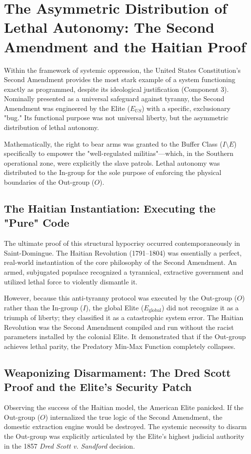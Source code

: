 \documentclass[12pt,openany]{book}
\begin{document}
\section{The Asymmetric Distribution of Lethal Autonomy: The Second Amendment and the Haitian Proof}

Within the framework of systemic oppression, the United States Constitution’s Second Amendment provides the most stark example of a system functioning exactly as programmed, despite its ideological justification (Component 3). Nominally presented as a universal safeguard against tyranny, the Second Amendment was engineered by the Elite ($E_{US}$) with a specific, exclusionary "bug." Its functional purpose was not universal liberty, but the asymmetric distribution of lethal autonomy.

Mathematically, the right to bear arms was granted to the Buffer Class ($I \setminus E$) specifically to empower the "well-regulated militias"—which, in the Southern operational zone, were explicitly the slave patrols. Lethal autonomy was distributed to the In-group for the sole purpose of enforcing the physical boundaries of the Out-group ($O$).

\subsection{The Haitian Instantiation: Executing the "Pure" Code}
The ultimate proof of this structural hypocrisy occurred contemporaneously in Saint-Domingue. The Haitian Revolution (1791–1804) was essentially a perfect, real-world instantiation of the core philosophy of the Second Amendment. An armed, subjugated populace recognized a tyrannical, extractive government and utilized lethal force to violently dismantle it.

However, because this anti-tyranny protocol was executed by the Out-group ($O$) rather than the In-group ($I$), the global Elite ($E_{\text{global}}$) did not recognize it as a triumph of liberty; they classified it as a catastrophic system error. The Haitian Revolution was the Second Amendment compiled and run without the racist parameters installed by the colonial Elite. It demonstrated that if the Out-group achieves lethal parity, the Predatory Min-Max Function completely collapses.

\subsection{Weaponizing Disarmament: The Dred Scott Proof and the Elite’s Security Patch}
Observing the success of the Haitian model, the American Elite panicked. If the Out-group ($O$) internalized the true logic of the Second Amendment, the domestic extraction engine would be destroyed. The systemic necessity to disarm the Out-group was explicitly articulated by the Elite's highest judicial authority in the 1857 \textit{Dred Scott v. Sandford} decision.
\end{document}
